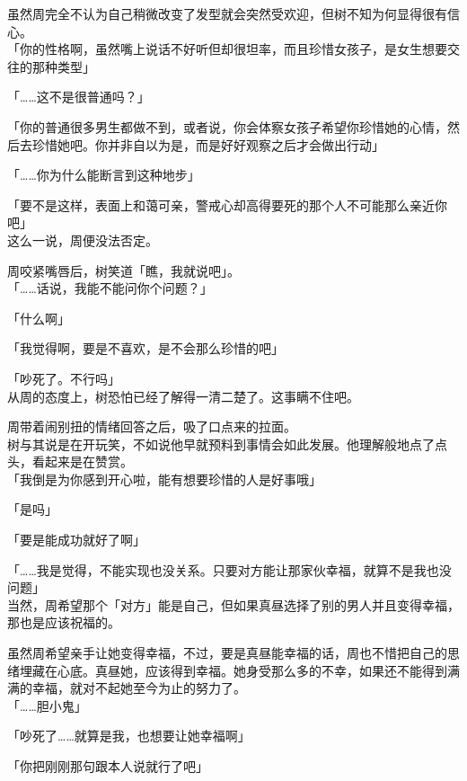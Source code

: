 虽然周完全不认为自己稍微改变了发型就会突然受欢迎，但树不知为何显得很有信心。\\

「你的性格啊，虽然嘴上说话不好听但却很坦率，而且珍惜女孩子，是女生想要交往的那种类型」

「……这不是很普通吗？」

「你的普通很多男生都做不到，或者说，你会体察女孩子希望你珍惜她的心情，然后去珍惜她吧。你并非自以为是，而是好好观察之后才会做出行动」

「……你为什么能断言到这种地步」

「要不是这样，表面上和蔼可亲，警戒心却高得要死的那个人不可能那么亲近你吧」\\

这么一说，周便没法否定。

周咬紧嘴唇后，树笑道「瞧，我就说吧」。\\

「……话说，我能不能问你个问题？」

「什么啊」

「我觉得啊，要是不喜欢，是不会那么珍惜的吧」

「吵死了。不行吗」\\

从周的态度上，树恐怕已经了解得一清二楚了。这事瞒不住吧。

周带着闹别扭的情绪回答之后，吸了口点来的拉面。\\

树与其说是在开玩笑，不如说他早就预料到事情会如此发展。他理解般地点了点头，看起来是在赞赏。\\

「我倒是为你感到开心啦，能有想要珍惜的人是好事哦」

「是吗」

「要是能成功就好了啊」

「……我是觉得，不能实现也没关系。只要对方能让那家伙幸福，就算不是我也没问题」\\

当然，周希望那个「对方」能是自己，但如果真昼选择了别的男人并且变得幸福，那也是应该祝福的。

虽然周希望亲手让她变得幸福，不过，要是真昼能幸福的话，周也不惜把自己的思绪埋藏在心底。真昼她，应该得到幸福。她身受那么多的不幸，如果还不能得到满满的幸福，就对不起她至今为止的努力了。\\%

「……胆小鬼」

「吵死了……就算是我，也想要让她幸福啊」

「你把刚刚那句跟本人说就行了吧」

